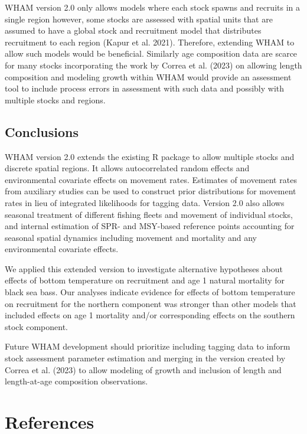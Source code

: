 \documentclass[
]{article}
\begin{document}
WHAM version 2.0 only allows models where each stock spawns and recruits
in a single region however, some stocks are assessed with spatial units
that are assumed to have a global stock and recruitment model that
distributes recruitment to each region (Kapur et al. 2021). Therefore,
extending WHAM to allow such models would be beneficial. Similarly age
composition data are scarce for many stocks incorporating the work by
Correa et al. (2023) on allowing length composition and modeling growth
within WHAM would provide an assessment tool to include process errors
in assessment with such data and possibly with multiple stocks and
regions.

\hypertarget{conclusions}{%
\subsection*{Conclusions}\label{conclusions}}

WHAM version 2.0 extends the existing R package to allow multiple stocks
and discrete spatial regions. It allows autocorrelated random effects
and environmental covariate effects on movement rates. Estimates of
movement rates from auxiliary studies can be used to construct prior
distributions for movement rates in lieu of integrated likelihoods for
tagging data. Version 2.0 also allows seasonal treatment of different
fishing fleets and movement of individual stocks, and internal
estimation of SPR- and MSY-based reference points accounting for
seasonal spatial dynamics including movement and mortality and any
environmental covariate effects.

We applied this extended version to investigate alternative hypotheses
about effects of bottom temperature on recruitment and age 1 natural
mortality for black sea bass. Our analyses indicate evidence for effects
of bottom temperature on recruitment for the northern component was
stronger than other models that included effects on age 1 mortality
and/or corresponding effects on the southern stock component.

Future WHAM development should prioritize including tagging data to
inform stock assessment parameter estimation and merging in the version
created by Correa et al. (2023) to allow modeling of growth and
inclusion of length and length-at-age composition observations.

\hypertarget{references}{%
\section*{References}\label{references}}
\end{document}
